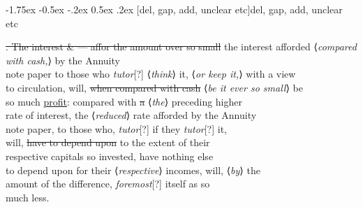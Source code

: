 \documentclass[11pt,twoside]{article}\makeatletter
\makeatletter
\renewcommand\section{\@startsection {section}{1}{\z@}%
     {-1.75ex \@plus -0.5ex \@minus -.2ex}%
     {0.5ex \@plus .2ex}%
     {\reset@font\Large\bfseries\sffamily}}
\makeatother
\begin{document}
\section[{del, gap, add, unclear etc}]{del, gap, add, unclear etc}\par
\sout{. The interest \& — affor the amount over so small} the interest afforded ⟨\textit{compared with cash,}⟩ by the Annuity{\hskip1pt}\\{} note paper to those who \textit{tutor}[?] ⟨\textit{think}⟩ it, ⟨\textit{or keep it,}⟩ with a view {\hskip1pt}\\{} to circulation, will, \sout{when compared with cash} ⟨\textit{be it ever so small}⟩ be {\hskip1pt}\\{} so much \uline{profit}: compared with \sout{a} ⟨\textit{the}⟩ preceding higher {\hskip1pt}\\{} rate of interest, the ⟨\textit{reduced}⟩ rate afforded by the Annuity {\hskip1pt}\\{} note paper, to those who, \textit{tutor}[?] if they \textit{tutor}[?] it, {\hskip1pt}\\{} will, \sout{have to depend upon} to the extent of their {\hskip1pt}\\{} respective capitals so invested, have nothing else {\hskip1pt}\\{} to depend upon for their ⟨\textit{respective}⟩ incomes, will, \sout{} ⟨\textit{by}⟩ the {\hskip1pt}\\{} amount of the difference, \textit{foremost}[?] itself as so {\hskip1pt}\\{} much less.
\end{document}
